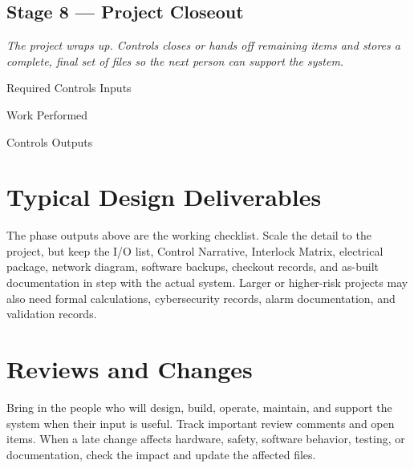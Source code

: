 \subsection{Stage 8 --- Project Closeout}
\textit{The project wraps up. Controls closes or hands off remaining items and stores a complete, final set of files so the next person can support the system.}

\begin{stagetable}{Required Controls Inputs}
\end{stagetable}

\begin{stagetable}{Work Performed}
\end{stagetable}

\begin{stagetable}{Controls Outputs}
\end{stagetable}

\section{Typical Design Deliverables}
The phase outputs above are the working checklist. Scale the detail to the project, but keep the I/O list, Control Narrative, Interlock Matrix, electrical package, network diagram, software backups, checkout records, and as-built documentation in step with the actual system. Larger or higher-risk projects may also need formal calculations, cybersecurity records, alarm documentation, and validation records.

\section{Reviews and Changes}
Bring in the people who will design, build, operate, maintain, and support the system when their input is useful. Track important review comments and open items. When a late change affects hardware, safety, software behavior, testing, or documentation, check the impact and update the affected files.
